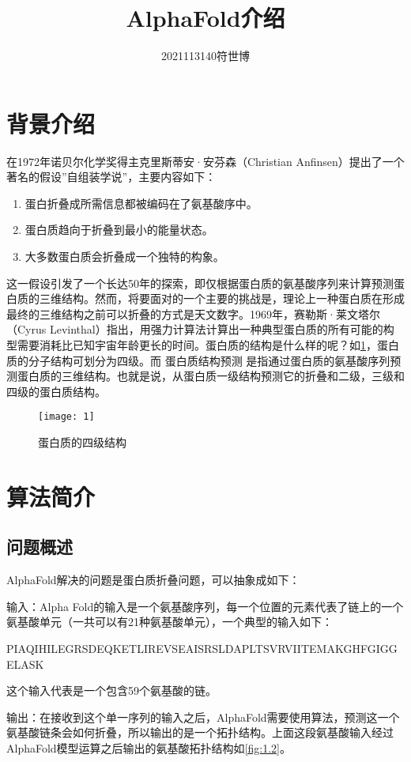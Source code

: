 \documentclass[withoutpreface,bwprint]{cumcmthesis}
\title{\textbf{AlphaFold介绍}}
\author{2021113140\quad 符世博}
\date{}
\begin{document}
\maketitle
\section{背景介绍}
在1972年诺贝尔化学奖得主克里斯蒂安·安芬森（Christian Anfinsen）提出了一个著名的假设”自组装学说”，主要内容如下：

\begin{enumerate}
    \item 蛋白折叠成所需信息都被编码在了氨基酸序中。
    \item 蛋白质趋向于折叠到最小的能量状态。
    \item 大多数蛋白质会折叠成一个独特的构象。
\end{enumerate}

这一假设引发了一个长达50年的探索，即仅根据蛋白质的氨基酸序列来计算预测蛋白质的三维结构。然而，将要面对的一个主要的挑战是，理论上一种蛋白质在形成最终的三维结构之前可以折叠的方式是天文数字。1969年，赛勒斯·莱文塔尔（Cyrus Levinthal）指出，用强力计算法计算出一种典型蛋白质的所有可能的构型需要消耗比已知宇宙年龄更长的时间。蛋白质的结构是什么样的呢？如\cref{fig:1.1}，蛋白质的分子结构可划分为四级。而 蛋白质结构预测 是指通过蛋白质的氨基酸序列预测蛋白质的三维结构。也就是说，从蛋白质一级结构预测它的折叠和二级，三级和四级的蛋白质结构。

\begin{figure}[H]
    \centering
    \texttt{[image: 1]}
    \caption{蛋白质的四级结构}
    \label{fig:1.1}
\end{figure}

\section{算法简介}
\subsection{问题概述}
AlphaFold解决的问题是蛋白质折叠问题，可以抽象成如下：

输入：Alpha Fold的输入是一个氨基酸序列，每一个位置的元素代表了链上的一个氨基酸单元（一共可以有21种氨基酸单元），一个典型的输入如下：

PIAQIHILEGRSDEQKETLIREVSEAISRSLDAPLTSVRVIITEMAKGHFGIGGELASK

这个输入代表是一个包含59个氨基酸的链。

输出：在接收到这个单一序列的输入之后，AlphaFold需要使用算法，预测这一个氨基酸链条会如何折叠，所以输出的是一个拓扑结构。上面这段氨基酸输入经过AlphaFold模型运算之后输出的氨基酸拓扑结构如\cref{fig:1.2}。
\end{document}
